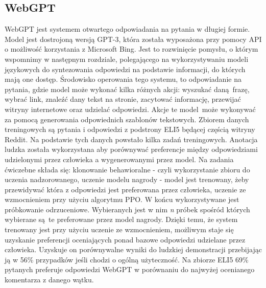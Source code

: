 \subsection{WebGPT}

WebGPT jest systemem otwartego odpowiadania na pytania w długiej formie. Model jest dostrojoną wersją GPT-3, która została wyposażona przy pomocy API o możliwość korzystania z Microsoft Bing. Jest to rozwinięcie pomysłu, o którym wspomnimy w następnym rozdziale, polegającego na wykorzystywaniu modeli językowych do syntezowania odpowiedzi na podstawie informacji, do których mają one dostęp. Środowisko operowania tego systemu, to odpowiadanie na pytania, gdzie model może wykonać kilka różnych akcji: wyszukać daną frazę, wybrać link, znaleźć dany tekst na stronie, zacytować informację, przewijać witryny internetowe oraz udzielać odpowiedzi. Akcje te model może wykonywać za pomocą generowania odpowiednich szablonów tekstowych. Zbiorem danych treningowych są pytania i odpowiedzi z podstrony ELI5 będącej częścią witryny Reddit. Na podstawie tych danych powstało kilka zadań treningowych. Anotacja ludzka została wykorzystana aby porównywać preferencje między odpowiedziami udzielonymi przez człowieka a wygenerowanymi przez model. Na zadania ćwiczebne składa się: klonowanie behawioralne - czyli wykorzystanie zbioru do uczenia nadzorowanego, uczenie modelu nagrody - model jest trenowany, żeby przewidywać która z odpowiedzi jest preferowana przez człowieka, uczenie ze wzmocnieniem przy użyciu algorytmu PPO. W końcu wykorzystywane jest próbkowanie odrzuceniowe. Wybieranych jest w nim \emph{n} próbek spośród których wybierane są te preferowane przez model nagrody. \autocite{nakano2021webgpt} Dzięki temu, że system trenowany jest przy użyciu uczenie ze wzmocnieniem, możliwym staje się uzyskanie preferencji oceniających ponad bazowe odpowiedzi udzielane przez człowieka. Uzyskuje on porównywalne wyniki do ludzkiej demonstracji przebijając ją w 56\% przypadków jeśli chodzi o ogólną użyteczność. Na zbiorze ELI5 69\% pytanych preferuje odpowiedzi WebGPT w porównaniu do najwyżej ocenianego komentarza z danego wątku. \autocite{nakano2021webgpt} 


